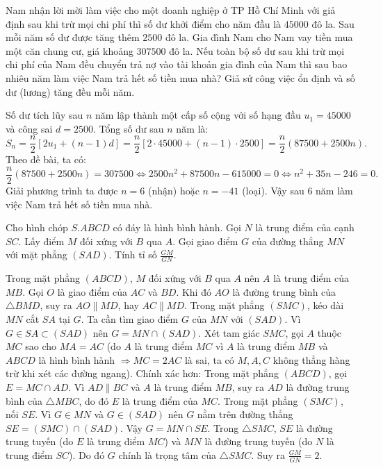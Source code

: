 \begin{baitap}
	Nam nhận lời mời làm việc cho một doanh nghiệp ở TP Hồ Chí Minh với giả định sau khi trừ mọi chi phí thì số dư khởi điểm cho năm đầu là $45000$ đô la. Sau mỗi năm số dư được tăng thêm $2500$ đô la. Gia đình Nam cho Nam vay tiền mua một căn chung cư, giá khoảng $307500$ đô la. Nếu toàn bộ số dư sau khi trừ mọi chi phí của Nam đều chuyển trả nợ vào tài khoản gia đình của Nam thì sau bao nhiêu năm làm việc Nam trả hết số tiền mua nhà?
	Giả sử công việc ổn định và số dư (lương) tăng đều mỗi năm.
	\begin{traloi}
		Số dư tích lũy sau $n$ năm lập thành một cấp số cộng với số hạng đầu $u_1 = 45000$ và công sai $d = 2500$.
		Tổng số dư sau $n$ năm là:
		\[
		S_n = \frac{n}{2} [2u_1 + (n - 1)d] = \frac{n}{2} [2 \cdot 45000 + (n - 1) \cdot 2500] = \frac{n}{2} (87500 + 2500n).
		\]
		Theo đề bài, ta có:
		\[
		\frac{n}{2} (87500 + 2500n) = 307500 \Leftrightarrow 2500n^2 + 87500n - 615000 = 0 \Leftrightarrow n^2 + 35n - 246 = 0.
		\]
		Giải phương trình ta được $n = 6$ (nhận) hoặc $n = -41$ (loại).
		Vậy sau $6$ năm làm việc Nam trả hết số tiền mua nhà.
	\end{traloi}
\end{baitap}

\begin{baitap}
	Cho hình chóp $S.ABCD$ có đáy là hình bình hành. Gọi $N$ là trung điểm của cạnh $SC$. Lấy điểm $M$ đối xứng với $B$ qua $A$. Gọi giao điểm $G$ của đường thẳng $MN$ với mặt phẳng $(SAD)$. Tính tỉ số $\frac{GM}{GN}$.
	\begin{traloi}
		\dapan{2}
		Trong mặt phẳng $(ABCD)$, $M$ đối xứng với $B$ qua $A$ nên $A$ là trung điểm của $MB$.
		Gọi $O$ là giao điểm của $AC$ và $BD$. Khi đó $AO$ là đường trung bình của $\triangle BMD$, suy ra $AO \parallel MD$, hay $AC \parallel MD$.
		Trong mặt phẳng $(SMC)$, kéo dài $MN$ cắt $SA$ tại $G$. Ta cần tìm giao điểm $G$ của $MN$ với $(SAD)$.
		Vì $G \in SA \subset (SAD)$ nên $G = MN \cap (SAD)$.
		Xét tam giác $SMC$, gọi $A$ thuộc $MC$ sao cho $MA = AC$ (do $A$ là trung điểm $MC$ vì $A$ là trung điểm $MB$ và $ABCD$ là hình bình hành $\Rightarrow MC = 2AC$ là sai, ta có $M, A, C$ không thẳng hàng trừ khi xét các đường ngang).
		Chính xác hơn: Trong mặt phẳng $(ABCD)$, gọi $E = MC \cap AD$. Vì $AD \parallel BC$ và $A$ là trung điểm $MB$, suy ra $AD$ là đường trung bình của $\triangle MBC$, do đó $E$ là trung điểm của $MC$.
		Trong mặt phẳng $(SMC)$, nối $SE$. Vì $G \in MN$ và $G \in (SAD)$ nên $G$ nằm trên đường thẳng $SE = (SMC) \cap (SAD)$.
		Vậy $G = MN \cap SE$.
		Trong $\triangle SMC$, $SE$ là đường trung tuyến (do $E$ là trung điểm $MC$) và $MN$ là đường trung tuyến (do $N$ là trung điểm $SC$).
		Do đó $G$ chính là trọng tâm của $\triangle SMC$.
		Suy ra $\frac{GM}{GN} = 2$.
	\end{traloi}
\end{baitap}

